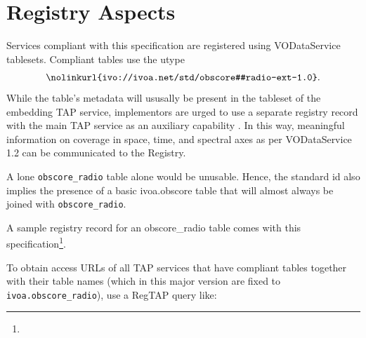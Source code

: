 \documentclass[11pt,a4paper]{ivoa}
\begin{document}
\section{Registry Aspects}
\label{sec:registry}

Services compliant with this specification are registered using
VODataService \citep{2021ivoa.spec.1102D} tablesets.
Compliant tables use the utype
$$ \hbox{\nolinkurl{ivo://ivoa.net/std/obscore#radio-ext-1.0}.} $$
%
While the table's metadata will ususally be present in the tableset of the
embedding TAP service, implementors are urged to use a separate registry
record with the main TAP service as an auxiliary capability
\citep{2019ivoa.spec.0520D}. In this way, meaningful information
on coverage in space, time, and spectral axes as per VODataService 1.2 can
be communicated to the Registry.


A lone \verb|obscore_radio| table alone would be unusable. Hence, the
standard id also implies the presence of a basic ivoa.obscore table that
will almost always be joined with \verb|obscore_radio|.

A sample registry record for an obscore\_radio table comes with this
specification\footnote{}.

To obtain access URLs of all TAP services that have compliant tables
together with their table names (which in this major version are fixed
to \verb|ivoa.obscore_radio|), use a RegTAP \citep{2019ivoa.spec.1011D}
query like:
\end{document}
